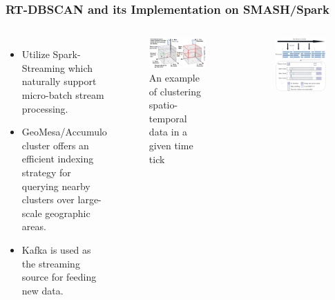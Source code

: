 \begin{frame}
    \frametitle{RT-DBSCAN and its Implementation on SMASH/Spark}
    \begin{columns}
            \begin{itemize}
                \item \tiny Utilize Spark-Streaming which naturally support micro-batch stream processing.
                \item \tiny GeoMesa/Accumulo cluster offers an efficient indexing strategy for querying nearby clusters over large-scale geographic areas.
                \item \tiny Kafka is used as the streaming source for feeding new data.
            \end{itemize}
            \begin{figure}
                \centering
                \includegraphics[width=\linewidth]{resource/figures/nearby-3d.png}
                \caption{\small An example of clustering spatio-temporal data in a given time tick}
            \end{figure}
        \begin{figure}
            \centering
            \includegraphics[width=\linewidth]{resource/figures/RT-DBSCAN_Spark.png}

\end{figure}
\end{columns}
\end{frame}
